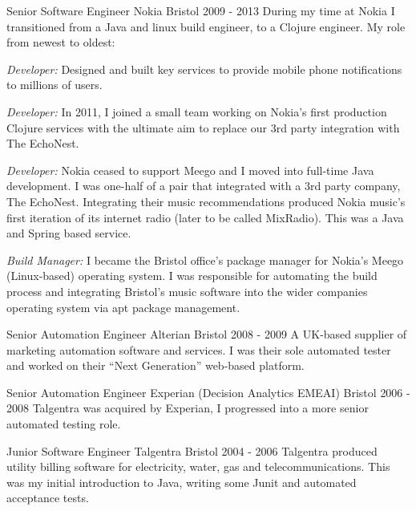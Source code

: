 \begin{cventries}
  \cventrypara
  {Senior Software Engineer} %
  {Nokia} %
  {Bristol} %
  {2009  - 2013} %
  {During my time at Nokia I transitioned from a Java and linux build engineer, to a Clojure engineer. My role from newest to oldest:}
  {
    \begin{cvitems} %
      \item {\emph{Developer:} Designed and built key services to provide mobile phone notifications to millions of users.}
      \item {\emph{Developer:} In 2011, I joined a small team working on Nokia's first production Clojure services with the ultimate aim to replace our 3rd party integration with The EchoNest.}
      \item {\emph{Developer:} Nokia ceased to support Meego and I moved into full-time Java development. I was one-half of a pair that integrated with a 3rd party company, The EchoNest.
      Integrating their music recommendations produced Nokia music’s first iteration of its internet radio (later to be called MixRadio). This was a Java and Spring based service.}
      \item {\emph{Build Manager:} I became the Bristol office's package manager for Nokia's Meego (Linux-based) operating system.
      I was responsible for automating the build process and integrating Bristol's music software into the wider companies operating system via apt package management.}
    \end{cvitems}
  }

  \cventry
  {Senior Automation Engineer} %
  {Alterian} %
  {Bristol} %
  {2008  - 2009} %
  {A UK-based supplier of marketing automation software and services. I was their sole automated tester and worked on
  their “Next Generation” web-based platform.}

  \cventry
  {Senior Automation Engineer} %
  {Experian (Decision Analytics EMEAI)} %
  {Bristol} %
  {2006  - 2008} %
  {Talgentra was acquired by Experian, I progressed into a more senior automated testing role.}

  \cventry
  {Junior Software Engineer} %
  {Talgentra} %
  {Bristol} %
  {2004 - 2006} %
  {Talgentra produced utility billing software for electricity, water, gas and telecommunications. This was my initial introduction to Java, writing some Junit and automated acceptance tests.
  }
\end{cventries}
